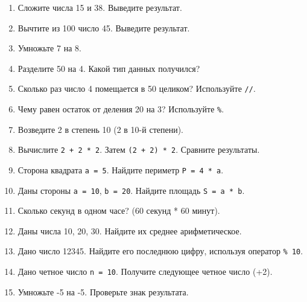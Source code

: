 \begin{enumerate}
    \item Сложите числа 15 и 38. Выведите результат.
    \item Вычтите из 100 число 45. Выведите результат.
    \item Умножьте 7 на 8.
    \item Разделите 50 на 4. Какой тип данных получился?
    \item Сколько раз число 4 помещается в 50 целиком? Используйте \texttt{//}.
    \item Чему равен остаток от деления 20 на 3? Используйте \texttt{\%}.
    \item Возведите 2 в степень 10 (2 в 10-й степени).
    \item Вычислите \texttt{2 + 2 * 2}. Затем \texttt{(2 + 2) * 2}. Сравните результаты.
    \item Сторона квадрата \texttt{a = 5}. Найдите периметр \texttt{P = 4 * a}.
    \item Даны стороны \texttt{a = 10}, \texttt{b = 20}. Найдите площадь \texttt{S = a * b}.
    \item Сколько секунд в одном часе? (60 секунд * 60 минут).
    \item Даны числа 10, 20, 30. Найдите их среднее арифметическое.
    \item Дано число 12345. Найдите его последнюю цифру, используя оператор \texttt{\% 10}.
    \item Дано четное число \texttt{n = 10}. Получите следующее четное число (+2).
    \item Умножьте -5 на -5. Проверьте знак результата.
\end{enumerate}
